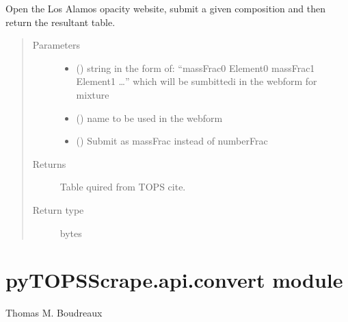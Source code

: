 \documentclass[letterpaper,10pt,english]{sphinxmanual}
\begin{document}
\begin{fulllineitems}
\label{\detokenize{pyTOPSScrape.api:pyTOPSScrape.api.api.submit_TOPS_form}}
\sphinxAtStartPar
Open the Los Alamos opacity website, submit a given composition and then
return the resultant table.
\begin{quote}\begin{description}
\item[{Parameters}] \leavevmode\begin{itemize}
\item {} 
\sphinxAtStartPar
{} () \textendash{} string in the form of: “massFrac0 Element0 massFrac1 Element1 …”
which will be sumbittedi in the webform for mixture

\item {} 
\sphinxAtStartPar
{} () \textendash{} name to be used in the webform

\item {} 
\sphinxAtStartPar
{} (\sphinxstyleliteralemphasis{\sphinxupquote{, }}) \textendash{} Submit as massFrac instead of numberFrac

\end{itemize}

\item[{Returns}] \leavevmode
\sphinxAtStartPar
{} \textendash{} Table quired from TOPS cite.

\item[{Return type}] \leavevmode
\sphinxAtStartPar
bytes

\end{description}\end{quote}

\end{fulllineitems}



\section{pyTOPSScrape.api.convert module}
\label{\detokenize{pyTOPSScrape.api:module-pyTOPSScrape.api.convert}}\label{\detokenize{pyTOPSScrape.api:pytopsscrape-api-convert-module}}
\sphinxAtStartPar
{} Thomas M. Boudreaux
\end{document}
